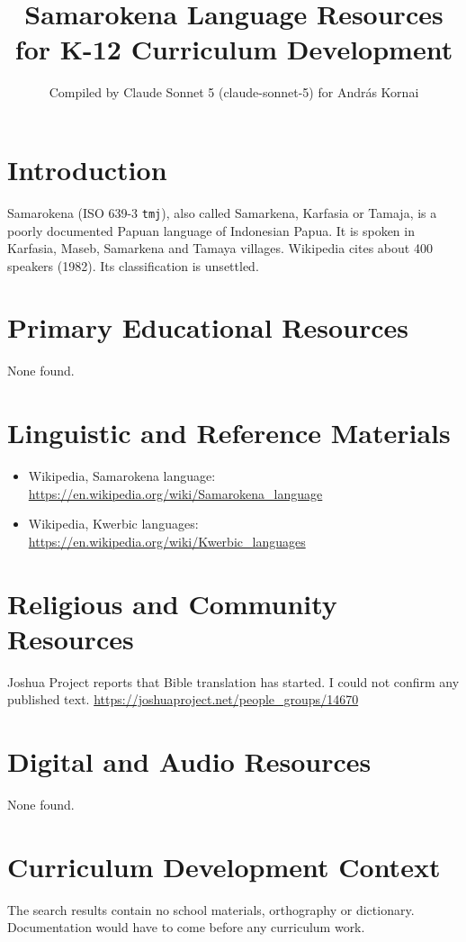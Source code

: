 \documentclass[12pt]{article}
\title{Samarokena Language Resources for K-12 Curriculum Development}
\author{Compiled by Claude Sonnet 5 (claude-sonnet-5) for Andr\'as Kornai}
\date{}
\begin{document}
\maketitle

\section{Introduction}
Samarokena (ISO 639-3 \texttt{tmj}), also called Samarkena, Karfasia or Tamaja, is a poorly documented Papuan language of Indonesian Papua. It is spoken in Karfasia, Maseb, Samarkena and Tamaya villages. Wikipedia cites about 400 speakers (1982). Its classification is unsettled.

\section{Primary Educational Resources}
None found.

\section{Linguistic and Reference Materials}
\begin{itemize}
\item Wikipedia, Samarokena language: \url{https://en.wikipedia.org/wiki/Samarokena_language}
\item Wikipedia, Kwerbic languages: \url{https://en.wikipedia.org/wiki/Kwerbic_languages}
\end{itemize}

\section{Religious and Community Resources}
Joshua Project reports that Bible translation has started. I could not confirm any published text. \url{https://joshuaproject.net/people_groups/14670}

\section{Digital and Audio Resources}
None found.

\section{Curriculum Development Context}
The search results contain no school materials, orthography or dictionary. Documentation would have to come before any curriculum work.
\end{document}
